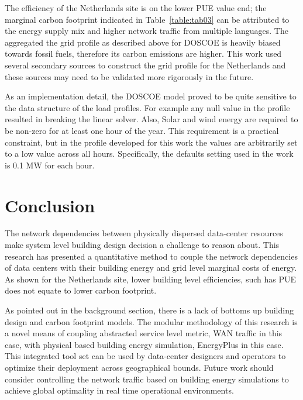 The efficiency of the Netherlands site is on the lower PUE value end; the marginal carbon footprint indicated in Table~\ref{table:tab03} can be attributed to the energy supply mix and higher network traffic from multiple languages. The aggregated the grid profile as described above for DOSCOE is heavily biased towards fossil fuels, therefore its carbon emissions are higher. This work used several secondary sources to construct the grid profile for the Netherlands and these sources may need to be validated more rigorously in the future.

As an implementation detail, the DOSCOE model proved to be quite sensitive to the data structure of the load profiles. For example any null value in the profile resulted in breaking the linear solver. Also, Solar and wind energy are required to be non-zero for at least one hour of the year. This requirement is a practical constraint, but in the profile developed for this work the values are arbitrarily set to a low value across all hours. Specifically, the defaults setting used in the work is 0.1 MW for each hour. 


\section{Conclusion}
The network dependencies between physically dispersed data-center resources make system level building design decision a challenge to reason about. This research has presented a quantitative method to couple the network dependencies of data centers with their building energy and grid level marginal costs of energy. As shown for the Netherlands site, lower building level efficiencies, such has PUE does not equate to lower carbon footprint.  

As pointed out in the background section, there is a lack of bottoms up building design and carbon footprint models. The modular methodology of this research is a novel means of coupling abstracted service level metric, WAN traffic in this case, with physical based building energy simulation, EnergyPlus in this case. This integrated tool set can be used by data-center designers and operators to optimize their deployment across geographical bounds. Future work should consider controlling the network traffic based on building energy simulations to achieve global optimality in real time operational environments.  


